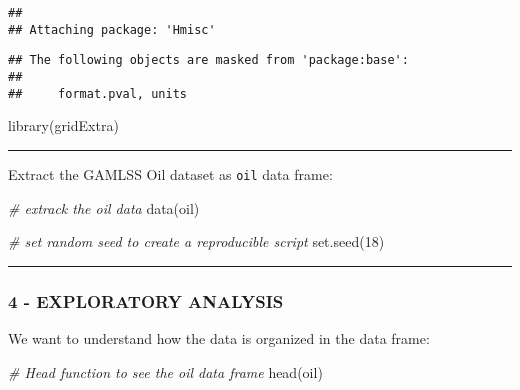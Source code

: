 \documentclass[
]{article}
\newenvironment{Shaded}{\begin{snugshade}}{\end{snugshade}}
\newcommand{\CommentTok}[1]{\textcolor[rgb]{0.56,0.35,0.01}{\textit{#1}}}
\newcommand{\DecValTok}[1]{\textcolor[rgb]{0.00,0.00,0.81}{#1}}
\newcommand{\FunctionTok}[1]{\textcolor[rgb]{0.00,0.00,0.00}{#1}}
\newcommand{\NormalTok}[1]{#1}
\begin{document}
\begin{verbatim}
## 
## Attaching package: 'Hmisc'
\end{verbatim}

\begin{verbatim}
## The following objects are masked from 'package:base':
## 
##     format.pval, units
\end{verbatim}

\begin{Shaded}
\begin{Highlighting}[]
\FunctionTok{library}\NormalTok{(gridExtra)}
\end{Highlighting}
\end{Shaded}

\begin{center}\rule{0.5\linewidth}{0.5pt}\end{center}

Extract the GAMLSS Oil dataset as \texttt{oil} data frame:

\begin{Shaded}
\begin{Highlighting}[]
\CommentTok{\# extrack the \textquotesingle{}oil\textquotesingle{} data}
\FunctionTok{data}\NormalTok{(oil)}

\CommentTok{\# set random seed to create a reproducible script}
\FunctionTok{set.seed}\NormalTok{(}\DecValTok{18}\NormalTok{)}
\end{Highlighting}
\end{Shaded}

\begin{center}\rule{0.5\linewidth}{0.5pt}\end{center}

\hypertarget{exploratory-analysis}{%
\subsubsection{4 - EXPLORATORY ANALYSIS}\label{exploratory-analysis}}

We want to understand how the data is organized in the data frame:

\begin{Shaded}
\begin{Highlighting}[]
\CommentTok{\# Head function to see the \textquotesingle{}oil\textquotesingle{} data frame}
\FunctionTok{head}\NormalTok{(oil)}
\end{Highlighting}
\end{Shaded}
\end{document}
